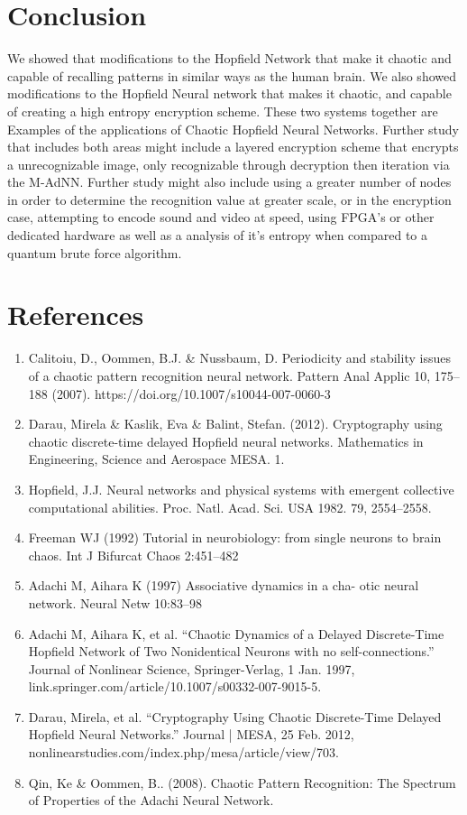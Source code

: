 \documentclass[12pt, letterpaper]{article}
\begin{document}
\section*{Conclusion}

We showed that modifications to the Hopfield Network that make it chaotic and capable of recalling patterns in similar ways as the human brain.  We also showed modifications to the Hopfield Neural network that makes it chaotic, and capable of creating a high entropy encryption scheme. These two systems together are Examples of the applications of Chaotic Hopfield Neural Networks. Further study that includes both areas might include a layered encryption scheme that encrypts a unrecognizable image, only recognizable through decryption then iteration via the M-AdNN. Further study might also include using a greater number of nodes in order to determine the recognition value at greater scale, or in the encryption case, attempting to encode sound and video at speed, using FPGA's or other dedicated hardware as well as a analysis of it's entropy when compared to a quantum brute force algorithm. 

\section*{References}

\fontsize{8}{12}\selectfont

\begin{enumerate}[leftmargin=*]
    \item Calitoiu, D., Oommen, B.J. \& Nussbaum, D. Periodicity and stability issues of a chaotic pattern recognition neural network. Pattern Anal Applic 10, 175–188 (2007). https://doi.org/10.1007/s10044-007-0060-3
    \item Darau, Mirela \& Kaslik, Eva \& Balint, Stefan. (2012). Cryptography using chaotic discrete-time delayed Hopfield neural networks. Mathematics in Engineering, Science and Aerospace MESA. 1.
    \item Hopfield, J.J. Neural networks and physical systems with emergent collective computational abilities.
    Proc. Natl. Acad. Sci. USA 1982. 79, 2554–2558.
    \item Freeman WJ (1992) Tutorial in neurobiology: from single neurons to brain chaos. Int J Bifurcat Chaos 2:451–482
    \item Adachi M, Aihara K (1997) Associative dynamics in a cha- otic neural network. Neural Netw 10:83–98
    \item Adachi M, Aihara K, et al. “Chaotic Dynamics of a Delayed Discrete-Time Hopfield Network of Two Nonidentical Neurons with no self-connections.” Journal of Nonlinear Science, Springer-Verlag, 1 Jan. 1997, link.springer.com/article/10.1007/s00332-007-9015-5.
    \item Darau, Mirela, et al. “Cryptography Using Chaotic Discrete-Time Delayed Hopfield Neural Networks.” Journal | MESA, 25 Feb. 2012, nonlinearstudies.com/index.php/mesa/article/view/703.
    \item Qin, Ke \& Oommen, B.. (2008). Chaotic Pattern Recognition: The Spectrum of Properties of the Adachi Neural Network.
\end{enumerate}
\end{document}
